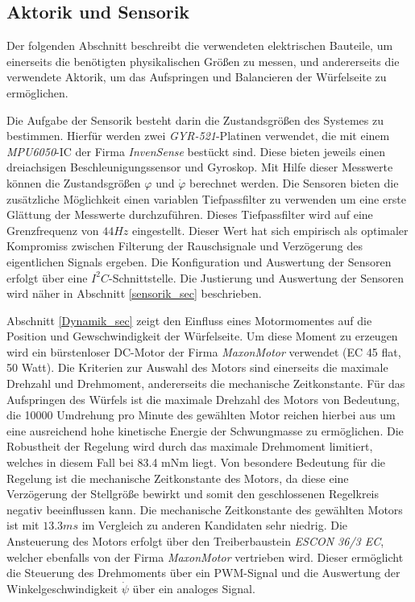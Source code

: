 \subsection{Aktorik und Sensorik}
Der folgenden Abschnitt beschreibt die verwendeten elektrischen Bauteile, um einerseits die benötigten physikalischen Größen zu messen, und andererseits die verwendete Aktorik, um das Aufspringen und Balancieren der Würfelseite zu ermöglichen.
\newline 

Die Aufgabe der Sensorik besteht darin die Zustandsgrößen des Systemes zu bestimmen. Hierfür werden zwei \textit{GYR-521}-Platinen verwendet, die mit einem \textit{MPU6050}-IC der Firma \textit{InvenSense} bestückt sind. Diese bieten jeweils einen dreiachsigen Beschleunigungssensor und Gyroskop. Mit Hilfe dieser Messwerte können die Zustandsgrößen $\varphi$ und $\dot{\varphi}$ berechnet werden. Die Sensoren bieten die zusätzliche Möglichkeit einen variablen Tiefpassfilter zu verwenden um eine erste Glättung der Messwerte durchzuführen. Dieses Tiefpassfilter wird auf eine Grenzfrequenz von $44Hz$ eingestellt. Dieser Wert hat sich empirisch als optimaler Kompromiss zwischen Filterung der Rauschsignale und Verzögerung des eigentlichen Signals ergeben. Die Konfiguration und Auswertung der Sensoren erfolgt über eine $I^2C$-Schnittstelle. Die Justierung und Auswertung der Sensoren wird näher in Abschnitt \ref{sensorik_sec} beschrieben.
\newline

Abschnitt \ref{Dynamik_sec} zeigt den Einfluss eines Motormomentes auf die Position und Gewschwindigkeit der Würfelseite. Um diese Moment zu erzeugen wird ein bürstenloser DC-Motor der Firma \textit{MaxonMotor} verwendet (EC 45 flat, 50 Watt). Die Kriterien zur Auswahl des Motors sind einerseits die maximale Drehzahl und Drehmoment, andererseits die mechanische Zeitkonstante. Für das Aufspringen des Würfels ist die maximale Drehzahl des Motors von Bedeutung, die 10000 Umdrehung pro Minute des gewählten Motor reichen hierbei aus um eine ausreichend hohe kinetische Energie der Schwungmasse zu ermöglichen. Die Robustheit der Regelung wird durch das maximale Drehmoment limitiert, welches in diesem Fall bei 83.4 mNm liegt. Von besondere Bedeutung für die Regelung ist die mechanische Zeitkonstante des Motors, da diese eine Verzögerung der Stellgröße bewirkt und somit den geschlossenen Regelkreis negativ beeinflussen kann. Die mechanische Zeitkonstante des gewählten Motors ist mit $13.3ms$ im Vergleich zu anderen Kandidaten sehr niedrig. Die Ansteuerung des Motors erfolgt über den Treiberbaustein \textit{ESCON 36/3 EC}, welcher ebenfalls von der Firma \textit{MaxonMotor} vertrieben wird. Dieser ermöglicht die Steuerung des Drehmoments über ein PWM-Signal und die Auswertung der Winkelgeschwindigkeit $\dot{\psi}$ über ein analoges Signal.
\newline


